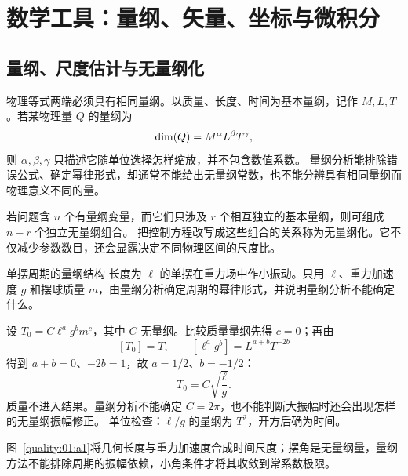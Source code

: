 \begingroup
{}
\chapter{数学工具：量纲、矢量、坐标与微积分}



\section{量纲、尺度估计与无量纲化}

物理等式两端必须具有相同量纲。以质量、长度、时间为基本量纲，记作
$M,L,T$。若某物理量 $Q$ 的量纲为
\begin{equation}
 \operatorname{dim}\!\left(Q\right)=M^\alpha L^\beta T^\gamma,
\end{equation}
则 $\alpha,\beta,\gamma$ 只描述它随单位选择怎样缩放，并不包含数值系数。
量纲分析能排除错误公式、确定幂律形式，却通常不能给出无量纲常数，也不能分辨具有相同量纲而物理意义不同的量。

若问题含 $n$ 个有量纲变量，而它们只涉及 $r$ 个相互独立的基本量纲，则可组成 $n-r$ 个独立无量纲组合。
把控制方程改写成这些组合的关系称为无量纲化。它不仅减少参数数目，还会显露决定不同物理区间的尺度比。

\begin{origexamplebox}{单摆周期的量纲结构}
长度为 $\ell$ 的单摆在重力场中作小振动。只用 $\ell$、重力加速度 $g$ 和摆球质量 $m$，由量纲分析确定周期的幂律形式，并说明量纲分析不能确定什么。

\end{origexamplebox}
\begin{xesolution}
设 $T_0=C\ell^a g^b m^c$，其中 $C$ 无量纲。比较质量量纲先得 $c=0$；再由
\[
 [T_0]=T,\qquad [\ell^ag^b]=L^{a+b}T^{-2b}
\]
得到 $a+b=0$、$-2b=1$，故 $a=1/2$、$b=-1/2$：
\[
 \boxed{T_0=C\sqrt{\frac{\ell}{g}}}.
\]
质量不进入结果。量纲分析不能确定 $C=2\pi$，也不能判断大振幅时还会出现怎样的无量纲振幅修正。
单位检查：$\ell/g$ 的量纲为 $T^2$，开方后确为时间。


图~\ref{quality:01:a1}将几何长度与重力加速度合成时间尺度；摆角是无量纲量，量纲方法不能排除周期的振幅依赖，小角条件才将其收敛到常系数极限。
\end{xesolution}

